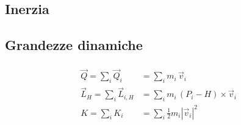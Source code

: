 \documentclass[letterpaper,10pt,italian]{jupyterBook}
\begin{document}
\subsection{Inerzia}
\label{\detokenize{ch/mechanics/inertia-points:inerzia}}\label{\detokenize{ch/mechanics/inertia-points:physics-hs-mechanics-inertia-points-inertia}}

\subsection{Grandezze dinamiche}
\label{\detokenize{ch/mechanics/inertia-points:grandezze-dinamiche}}\label{\detokenize{ch/mechanics/inertia-points:physics-hs-mechanics-inertia-points-dynamical-quantities}}\begin{equation*}
\begin{split}\begin{aligned}
  \vec{Q}       = \sum_i \vec{Q}_i     & = \sum_i  m_i \, \vec{v}_i \\
  \vec{L}_{H}   = \sum_i \vec{L}_{i,H} & = \sum_i  m_i \, (P_i - H) \times \vec{v}_i \\
   K            = \sum_i  K_i          & = \sum_i  \frac{1}{2} m_i \left| \vec{v}_i \right|^2
\end{aligned}\end{split}
\end{equation*}
\end{document}
